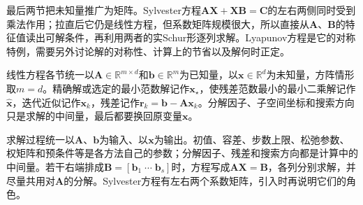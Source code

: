 最后两节把未知量推广为矩阵。Sylvester方程$\bm A\bm X+\bm X\bm B=\bm C$的左右两侧同时受到乘法作用；拉直后它仍是线性方程，但系数矩阵规模很大，所以直接从$\bm A$、$\bm B$的特征值读出可解条件，再利用两者的实Schur形逐列求解。Lyapunov方程是它的对称特例，需要另外讨论解的对称性、计算上的节省以及解何时正定。

线性方程各节统一以$\bm A\in\mathbb R^{m\times d}$和$\bm b\in\mathbb R^m$为已知量，以$\bm x\in\mathbb R^d$为未知量，方阵情形取$m=d$。精确解或选定的最小范数解记作$\bm x_\star$，使残差范数最小的最小二乘解记作$\hat{\bm x}$，迭代近似记作$\bm x_k$，残差记作$\bm r_k=\bm b-\bm A\bm x_k$。分解因子、子空间坐标和搜索方向只是求解的中间量，最后都要换回原变量$\bm x$。

求解过程统一以$\bm A$、$\bm b$为输入、以$\bm x$为输出。初值、容差、步数上限、松弛参数、权矩阵和预条件等是各方法自己的参数；分解因子、残差和搜索方向都是计算中的中间量。若干右端排成$\bm B=[\bm b_1\;\cdots\;\bm b_s]$时，方程写成$\bm A\bm X=\bm B$，各列分别求解，并尽量共用对$\bm A$的分解。Sylvester方程有左右两个系数矩阵，引入时再说明它们的角色。













